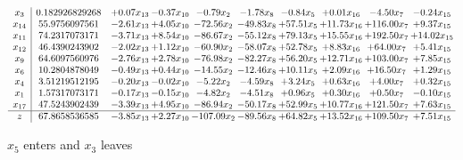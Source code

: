 \documentclass[9pt]{article}
\begin{document}
 \[\begin{array}{c| c c@{\hskip 2pt} c@{\hskip 2pt} c@{\hskip 2pt} c@{\hskip 2pt} c@{\hskip 2pt} c@{\hskip 2pt} c@{\hskip 2pt} c@{\hskip 2pt} }
 x_{3}   &  0.182926829268 & +  0.07 x_{13} & -0.37 x_{10} & -0.79 x_{2} & -1.78 x_{8} & -0.84 x_{5} & +  0.01 x_{16} & -4.50 x_{7} & -0.24 x_{15}\\
 x_{14}   &  55.9756097561 & -2.61 x_{13} & +  4.05 x_{10} & -72.56 x_{2} & -49.83 x_{8} & + 57.51 x_{5} & + 11.73 x_{16} & + 116.00 x_{7} & +  9.37 x_{15}\\
 x_{11}   &  74.2317073171 & -3.71 x_{13} & +  8.54 x_{10} & -86.67 x_{2} & -55.12 x_{8} & + 79.13 x_{5} & + 15.55 x_{16} & + 192.50 x_{7} & + 14.02 x_{15}\\
 x_{12}   &  46.4390243902 & -2.02 x_{13} & +  1.12 x_{10} & -60.90 x_{2} & -58.07 x_{8} & + 52.78 x_{5} & +  8.83 x_{16} & + 64.00 x_{7} & +  5.41 x_{15}\\
 x_{9}   &  64.6097560976 & -2.76 x_{13} & +  2.78 x_{10} & -76.98 x_{2} & -82.27 x_{8} & + 56.20 x_{5} & + 12.71 x_{16} & + 103.00 x_{7} & +  7.85 x_{15}\\
 x_{6}   &  10.2804878049 & -0.49 x_{13} & +  0.44 x_{10} & -14.55 x_{2} & -12.46 x_{8} & + 10.11 x_{5} & +  2.09 x_{16} & + 16.50 x_{7} & +  1.29 x_{15}\\
 x_{4}   &  3.51219512195 & -0.20 x_{13} & -0.02 x_{10} & -5.22 x_{2} & -4.59 x_{8} & +  3.24 x_{5} & +  0.63 x_{16} & +  4.00 x_{7} & +  0.32 x_{15}\\
 x_{1}   &  1.57317073171 & -0.17 x_{13} & -0.15 x_{10} & -4.82 x_{2} & -4.51 x_{8} & +  0.96 x_{5} & +  0.30 x_{16} & +  0.50 x_{7} & -0.10 x_{15}\\
 x_{17}   &  47.5243902439 & -3.39 x_{13} & +  4.95 x_{10} & -86.94 x_{2} & -50.17 x_{8} & + 52.99 x_{5} & + 10.77 x_{16} & + 121.50 x_{7} & +  7.63 x_{15}\\
\hline
z    &  67.8658536585 & -3.85 x_{13} & +  2.27 x_{10} & -107.09 x_{2} & -89.56 x_{8} & + 64.82 x_{5} & + 13.52 x_{16} & + 109.50 x_{7} & +  7.51 x_{15}\\
\end{array}\]


 $ x_{5} $ enters and $ x_{3} $ leaves 
\end{document}
